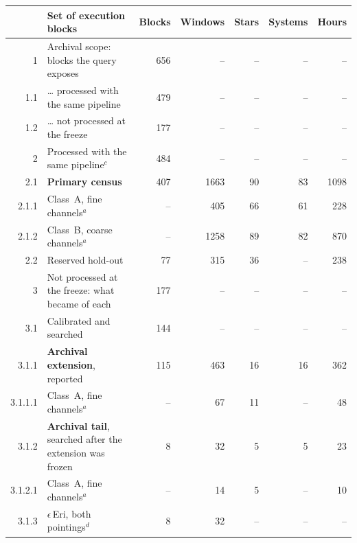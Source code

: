 \begin{tabular}{@{}r@{~}p{}rrrrr@{}}
\hline
 & Set of execution blocks & Blocks & Windows & Stars & Systems & Hours \\
\hline
1 & Archival scope: blocks the query exposes & 656 & -- & -- & -- & -- \\
1.1 & \hspace{0.8em}\ldots{} processed with the same pipeline & 479 & -- & -- & -- & -- \\
1.2 & \hspace{0.8em}\ldots{} not processed at the freeze & 177 & -- & -- & -- & -- \\
\hline
2 & Processed with the same pipeline$^{c}$ & 484 & -- & -- & -- & -- \\
2.1 & \hspace{0.8em}\textbf{Primary census} & 407 & 1663 & 90 & 83 & 1098 \\
2.1.1 & \hspace{1.6em}Class~A, fine channels$^{a}$ & -- & 405 & 66 & 61 & 228 \\
2.1.2 & \hspace{1.6em}Class~B, coarse channels$^{a}$ & -- & 1258 & 89 & 82 & 870 \\
2.2 & \hspace{0.8em}Reserved hold-out & 77 & 315 & 36 & -- & 238 \\
\hline
3 & Not processed at the freeze: what became of each & 177 & -- & -- & -- & -- \\
3.1 & \hspace{0.8em}Calibrated and searched & 144 & -- & -- & -- & -- \\
3.1.1 & \hspace{1.6em}\textbf{Archival extension}, reported & 115 & 463 & 16 & 16 & 362 \\
3.1.1.1 & \hspace{2.4em}Class~A, fine channels$^{a}$ & -- & 67 & 11 & -- & 48 \\
3.1.2 & \hspace{1.6em}\textbf{Archival tail}, searched after the extension was frozen & 8 & 32 & 5 & 5 & 23 \\
3.1.2.1 & \hspace{2.4em}Class~A, fine channels$^{a}$ & -- & 14 & 5 & -- & 10 \\
3.1.3 & \hspace{1.6em}$\epsilon$\,Eri, both pointings$^{d}$ & 8 & 32 & -- & -- & -- \\

\end{tabular}
